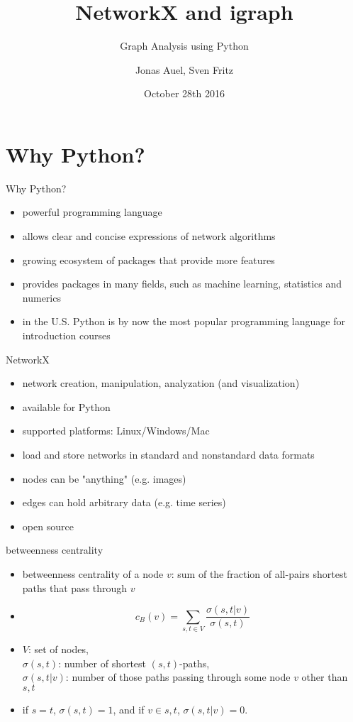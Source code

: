 \documentclass[12pt]{beamer}
\author{Jonas Auel, Sven Fritz}
\title{NetworkX and igraph}
\subtitle{Graph Analysis using Python}
\institute{Uni Mannheim}
\date{October 28th 2016}
\begin{document}
	\maketitle
	\section{Why Python?}
	\begin{frame}{Why Python?}
		\begin{itemize}
			\item powerful programming language
			\item allows clear and concise expressions of network algorithms
			\item growing ecosystem of packages that provide more features
			\item provides packages in many fields, such as machine learning, statistics and numerics
			\item in the U.S. Python is by now the most popular programming language for introduction courses
		\end{itemize}
	\end{frame}
	\begin{frame}{NetworkX}
		\begin{itemize}
			\item network creation, manipulation, analyzation (and visualization)
			\item available for Python
			\item supported platforms: Linux/Windows/Mac
			\item load and store networks in standard and nonstandard data formats
			\item nodes can be "anything" (e.g. images)
			\item edges can hold arbitrary data (e.g. time series)
			\item open source
		\end{itemize}
	\end{frame}
	\begin{frame}{betweenness centrality}
	\begin{itemize}
		\item betweenness centrality of a node $v$: sum of the
		fraction of all-pairs shortest paths that pass through $v$
		\item 		
		\begin{equation*}
		c_B(v) =\sum_{s,t \in V} \frac{\sigma(s, t|v)}{\sigma(s, t)}
		\end{equation*}	
		\item  $V$: set of nodes,\\
		$\sigma(s, t)$: number of
		shortest $(s, t)$-paths, \\
		$\sigma(s, t|v)$: number of those
		paths  passing through some  node $v$ other than $s, t$
		\item if $s = t$, $\sigma(s, t) = 1$, and if $v \in {s, t}$,
		$\sigma(s, t|v) = 0$.
	\end{itemize}
	\end{frame}
\end{document}
